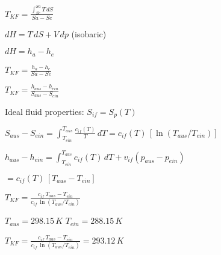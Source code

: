 \( T_{KF} = \frac{\int_{Se}^{Sa} T \, dS}{Sa - Se} \)  

\( dH = T \, dS + V \, dp \) (isobaric)  

\( dH = h_a - h_e \)  

\( T_{KF} = \frac{h_a - h_e}{Sa - Se} \)  

\( T_{KF} = \frac{h_{aus} - h_{ein}}{S_{aus} - S_{ein}} \)  

Ideal fluid properties:  
\( S_{if} = S_p(T) \)  

\( S_{aus} - S_{ein} = \int_{T_{ein}}^{T_{aus}} \frac{c_{if}(T)}{T} \, dT = c_{if}(T) \, [\ln(T_{aus}/T_{ein})] \)  

\( h_{aus} - h_{ein} = \int_{T_{ein}}^{T_{aus}} c_{if}(T) \, dT + v_{if}(p_{aus} - p_{ein}) \)  

\( = c_{if}(T) \, [T_{aus} - T_{ein}] \)  

\( T_{KF} = \frac{c_{if} \, T_{aus} - T_{ein}}{c_{if} \, \ln(T_{aus}/T_{ein})} \)  

\( T_{aus} = 298.15 \, K \)  
\( T_{ein} = 288.15 \, K \)  

\( T_{KF} = \frac{c_{if} \, T_{aus} - T_{ein}}{c_{if} \, \ln(T_{aus}/T_{ein})} = 293.12 \, K \)